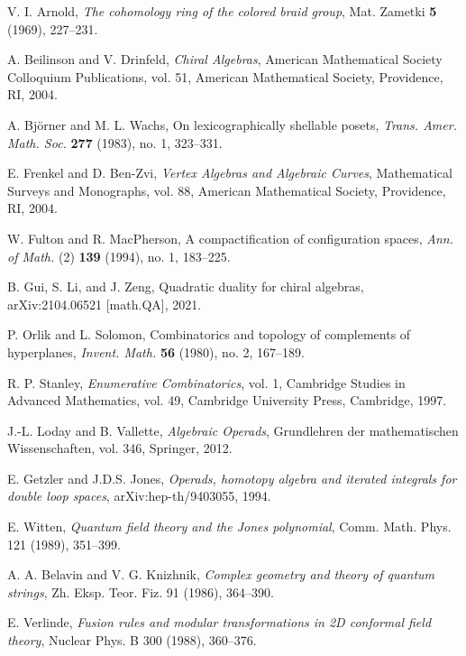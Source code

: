 

\begin{thebibliography}{99}

V. I. Arnold, \emph{The cohomology ring of the colored braid group}, 
Mat. Zametki \textbf{5} (1969), 227--231.

 A. Beilinson and V. Drinfeld, \emph{Chiral Algebras}, American Mathematical Society Colloquium Publications, vol. 51, American Mathematical Society, Providence, RI, 2004.
 
 A. Björner and M. L. Wachs, On lexicographically shellable posets, \emph{Trans. Amer. Math. Soc.} \textbf{277} (1983), no. 1, 323--331.
 
 E. Frenkel and D. Ben-Zvi, \emph{Vertex Algebras and Algebraic Curves}, Mathematical Surveys and Monographs, vol. 88, American Mathematical Society, Providence, RI, 2004.
 
 W. Fulton and R. MacPherson, A compactification of configuration spaces, \emph{Ann. of Math.} (2) \textbf{139} (1994), no. 1, 183--225.
 
 B. Gui, S. Li, and J. Zeng, Quadratic duality for chiral algebras, arXiv:2104.06521 [math.QA], 2021.
 
 P. Orlik and L. Solomon, Combinatorics and topology of complements of hyperplanes, \emph{Invent. Math.} \textbf{56} (1980), no. 2, 167--189.
 
 R. P. Stanley, \emph{Enumerative Combinatorics}, vol. 1, Cambridge Studies in Advanced Mathematics, vol. 49, Cambridge University Press, Cambridge, 1997.

 J.-L. Loday and B. Vallette, \emph{Algebraic Operads}, Grundlehren der mathematischen Wissenschaften, vol. 346, Springer, 2012.

 E. Getzler and J.D.S. Jones, \emph{Operads, homotopy algebra and iterated integrals for double loop spaces}, arXiv:hep-th/9403055, 1994.

 E. Witten, \emph{Quantum field theory and the Jones polynomial}, 
  Comm. Math. Phys. 121 (1989), 351--399.

 A. A. Belavin and V. G. Knizhnik, \emph{Complex geometry and theory of quantum strings}, 
  Zh. Eksp. Teor. Fiz. 91 (1986), 364--390.
  
 E. Verlinde, \emph{Fusion rules and modular transformations in 2D conformal field theory}, 
  Nuclear Phys. B 300 (1988), 360--376.


\end{thebibliography}
